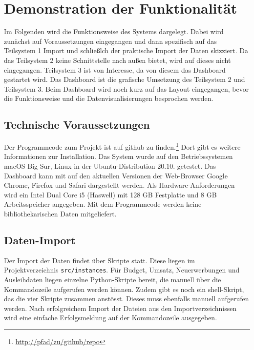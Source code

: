 
\section{Demonstration der Funktionalität}

    Im Folgenden wird die Funktionsweise des Systems dargelegt. Dabei wird zunächst auf Voraussetzungen eingegangen und dann
    spezifisch auf das Teilsystem 1 Import und schließlch der
    praktische Import der Daten skizziert. Da das Teilsystem 2 keine Schnittstelle
    nach außen bietet, wird auf dieses nicht eingegangen. Teilsystem 3 ist von Interesse, da von diesem das Dashboard
    gestartet wird. Das Dashboard ist die grafische Umsetzung des Teilsystem 2 und Teilsystem 3. Beim Dashboard wird noch kurz auf das Layout
    eingegangen, bevor die Funktionsweise und die Datenvisualisierungen besprochen werden.


    \subsection{Technische Voraussetzungen}
    Der Programmcode zum Projekt ist auf github zu finden.\footnote{\url{http://pfad/zu/github/repo}} Dort gibt es weitere Informationen zur Installation.
    Das System wurde auf den Betriebssystemen macOS Big Sur, Linux in der Ubuntu-Distribution 20.10. getestet.
    Das Dashboard kann mit auf den aktuellen Versionen der Web-Browser Google Chrome, Firefox und Safari dargestellt werden. 
    Als Hardware-Anforderungen wird ein Intel Dual Core i5 (Haswell) mit 128 GB Festplatte und 8 GB Arbeitsspeicher angegeben. 
    Mit dem Programmcode werden keine bibliothekarischen Daten mitgeliefert.
    
    \subsection{Daten-Import}
    Der Import der Daten findet über Skripte statt. Diese liegen im Projektverzeichnis \texttt{src/instances}.
    Für Budget, Umsatz, Neuerwerbungen und Ausleihdaten liegen einzelne Python-Skripte bereit, die manuell über die Kommandozeile
    aufgerufen werden können. Zudem gibt es noch ein shell-Skript, das die vier Skripte zusammen anstösst. Dieses
    muss ebenfalls manuell aufgerufen werden.
    Nach erfolgreichem Import der Dateien aus den Importverzeichnissen wird eine einfache Erfolgsmeldung auf der Kommandozeile ausgegeben.

